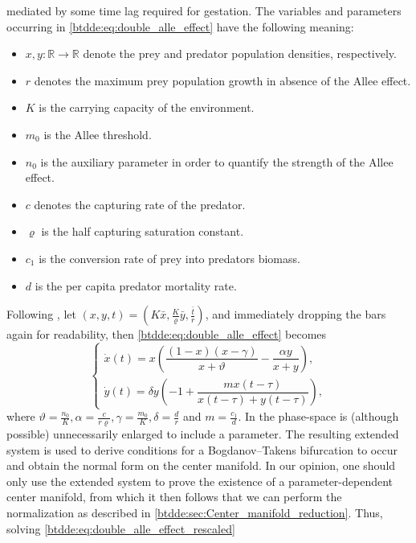 mediated by some time lag required for gestation.
The variables and parameters occurring in \cref{btdde:eq:double_alle_effect}
have the following meaning:
\begin{itemize}
\item $x,y\colon \mathbb R \rightarrow \mathbb R$ denote the prey and predator population densities, respectively.
\item $r$ denotes the maximum prey population growth in absence of the Allee effect.
\item $K$ is the carrying capacity of the environment.
\item $m_0$ is the Allee threshold.
\item $n_0$ is the auxiliary parameter in order to quantify the strength of the Allee effect.
\item $c$ denotes the capturing rate of the predator.
\item $\varrho$ is the half capturing saturation constant.
\item $c_1$ is the conversion rate of prey into predators biomass.
\item $d$ is the per capita predator mortality rate.
\end{itemize}
Following \cite{Jiao2021}, let $(x,y,t) = \left(K\bar x, \frac K \varrho \bar y, \frac{\bar t}r\right)$, and immediately 
dropping the bars again for readability, then \cref{btdde:eq:double_alle_effect} becomes
\begin{equation}
\label{btdde:eq:double_alle_effect_rescaled}
\begin{cases}
    \dot x(t) = x \left( \dfrac{(1-x)(x-\gamma)}{x+\vartheta} - \dfrac{\alpha y}{x+y} \right), \\
    \dot y(t) = \delta y \left( -1 + \dfrac{ m x(t-\tau) }{ x(t-\tau) + y(t-\tau) }\right),
\end{cases}
\end{equation}
where $\vartheta = \frac{n_0}K, \alpha=\frac c{r\varrho}, \gamma = \frac{m_0}K, \delta = \frac dr$ and $m=\frac{c_1}d$.
In \cite{Jiao2021} the phase-space is (although possible) unnecessarily
enlarged to include a parameter. The resulting extended system is used to
derive conditions for a Bogdanov--Takens bifurcation to occur and obtain the
normal form on the center manifold. In our opinion, one should only use the
extended system to prove the existence of a parameter-dependent center manifold,
from which it then follows that we can perform the normalization as
described in \cref{btdde:sec:Center_manifold_reduction}. Thus, solving \cref{btdde:eq:double_alle_effect_rescaled}
